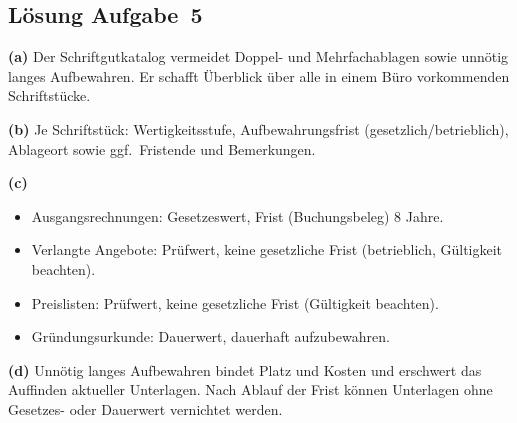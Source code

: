 \documentclass[11pt, a4paper]{article}
\begin{document}
\subsection*{Lösung Aufgabe~5}
\begin{loesung}
\textbf{(a)} Der Schriftgutkatalog vermeidet Doppel- und Mehrfachablagen sowie unnötig
langes Aufbewahren. Er schafft Überblick über alle in einem Büro vorkommenden
Schriftstücke.

\textbf{(b)} Je Schriftstück: Wertigkeitsstufe, Aufbewahrungsfrist (gesetzlich/betrieblich),
Ablageort sowie ggf.\ Fristende und Bemerkungen.

\textbf{(c)}
\begin{itemize}[itemsep=0pt]
  \item Ausgangsrechnungen: Gesetzeswert, Frist (Buchungsbeleg) 8 Jahre.
  \item Verlangte Angebote: Prüfwert, keine gesetzliche Frist (betrieblich, Gültigkeit beachten).
  \item Preislisten: Prüfwert, keine gesetzliche Frist (Gültigkeit beachten).
  \item Gründungsurkunde: Dauerwert, dauerhaft aufzubewahren.
\end{itemize}

\textbf{(d)} Unnötig langes Aufbewahren bindet Platz und Kosten und erschwert das
Auffinden aktueller Unterlagen. Nach Ablauf der Frist können Unterlagen ohne Gesetzes-
oder Dauerwert vernichtet werden.
\end{loesung}
\end{document}
